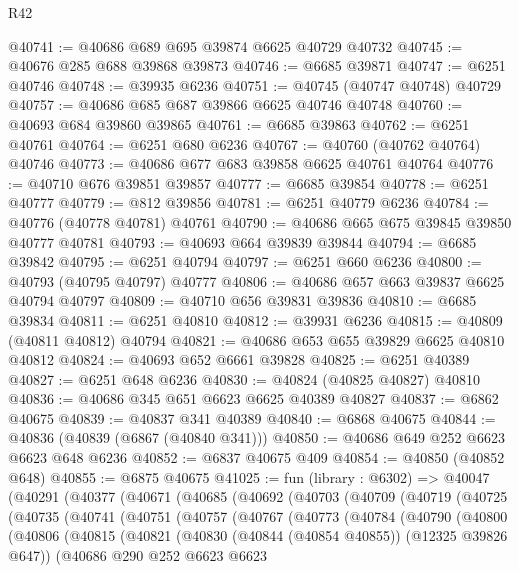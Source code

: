 \begin{lexlean}{R42}
\begin{coremodule}
{@40741 := @40686 @689 @695 @39874 @6625 @40729 @40732
@40745 := @40676 @285 @688 @39868 @39873
@40746 := @6685 @39871
@40747 := @6251 @40746
@40748 := @39935 @6236
@40751 := @40745 (@40747 @40748) @40729
@40757 := @40686 @685 @687 @39866 @6625 @40746 @40748
@40760 := @40693 @684 @39860 @39865
@40761 := @6685 @39863
@40762 := @6251 @40761
@40764 := @6251 @680 @6236
@40767 := @40760 (@40762 @40764) @40746
@40773 := @40686 @677 @683 @39858 @6625 @40761 @40764
@40776 := @40710 @676 @39851 @39857
@40777 := @6685 @39854
@40778 := @6251 @40777
@40779 := @812 @39856
@40781 := @6251 @40779 @6236
@40784 := @40776 (@40778 @40781) @40761
@40790 := @40686 @665 @675 @39845 @39850 @40777 @40781
@40793 := @40693 @664 @39839 @39844
@40794 := @6685 @39842
@40795 := @6251 @40794
@40797 := @6251 @660 @6236
@40800 := @40793 (@40795 @40797) @40777
@40806 := @40686 @657 @663 @39837 @6625 @40794 @40797
@40809 := @40710 @656 @39831 @39836
@40810 := @6685 @39834
@40811 := @6251 @40810
@40812 := @39931 @6236
@40815 := @40809 (@40811 @40812) @40794
@40821 := @40686 @653 @655 @39829 @6625 @40810 @40812
@40824 := @40693 @652 @6661 @39828
@40825 := @6251 @40389
@40827 := @6251 @648 @6236
@40830 := @40824 (@40825 @40827) @40810
@40836 := @40686 @345 @651 @6623 @6625 @40389 @40827
@40837 := @6862 @40675
@40839 := @40837 @341 @40389
@40840 := @6868 @40675
@40844 := @40836 (@40839 (@6867 (@40840 @341)))
@40850 := @40686 @649 @252 @6623 @6623 @648 @6236
@40852 := @6837 @40675 @409
@40854 := @40850 (@40852 @648)
@40855 := @6875 @40675
@41025 := fun (library : @6302) =>
  @40047
    (@40291
      (@40377
        (@40671
          (@40685
            (@40692
              (@40703
                (@40709
                  (@40719
                    (@40725
                      (@40735
                        (@40741
                          (@40751
                            (@40757
                              (@40767
                                (@40773
                                  (@40784
                                    (@40790
                                      (@40800
                                        (@40806
                                          (@40815
                                            (@40821
                                              (@40830 (@40844 (@40854 @40855)) (@12325 @39826 @647))
                                              (@40686
                                                @290
                                                @252
                                                @6623
                                                @6623
}
\end{coremodule}
\end{lexlean}
